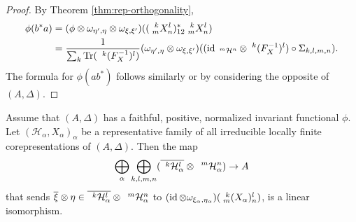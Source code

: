 \begin{proof}
  By Theorem \ref{thm:rep-orthogonality}, 
  \begin{align*}
    \phi(b^{*}a) &= (\phi \otimes \omega_{\eta',\eta} \otimes
    \omega_{\xi,\xi'})((\Gr{X}{k}{l}{m}{n})_{12}^{*}\Gr{X}{k}{l}{m}{n})
    \\
    &= \frac{1}{\sum_{k} \Tr(\Gru{(F_{X}^{-1})}{k}{l})} 
    (\omega_{\eta',\eta} \otimes
    \omega_{\xi,\xi'})(   (
    \id_{\Gru{\mathcal{H}}{m}{n}} \otimes \Gru{(F_{X}^{-1})}{k}{l})
    \circ \Sigma_{k,l,m,n}). 
  \end{align*}
  The formula for $\phi(ab^{*})$ follows similarly or by considering
  the opposite of $(A,\Delta)$.
\end{proof}
\begin{Cor} \label{cor:rep-pw}
  Assume that $(A,\Delta)$ has a faithful, positive, normalized
  invariant functional $\phi$. Let
  $(\mathcal{H}_{\alpha},X_{\alpha})_{\alpha}$ be a representative
  family of all irreducible locally finite corepresentations of
  $(A,\Delta)$. Then the map
  \begin{align*}
    \bigoplus_{\alpha} \bigoplus_{k,l,m,n}
    (\overline{\Gru{\mathcal{H}_{\alpha}}{k}{l}} \otimes
    \Gru{\mathcal{H}_{\alpha}}{m}{n}) \to A
  \end{align*}
  that sends $\overline{\xi} \otimes \eta \in
  \overline{\Gru{\mathcal{H}_{\alpha}}{k}{l}} \otimes
  \Gru{\mathcal{H}_{\alpha}}{m}{n}$ to $ (\id \otimes
  \omega_{\xi_{\alpha},\eta_{\alpha}})(\Gr{(X_{\alpha})}{k}{l}{m}{n})$,
  is a linear isomorphism.
\end{Cor}

